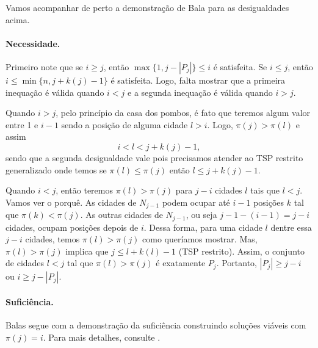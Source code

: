 \documentclass{article}
\begin{document}
Vamos acompanhar de perto a demonstração de Bala para as desigualdades acima.

\paragraph{Necessidade.} Primeiro note que se $i \geq j$, então $\max \{1, j - |P_j|\} \leq i$ é satisfeita. Se $i \leq j$, então $i \leq \min\{n, j + k(j) - 1\}$ é satisfeita. Logo, falta mostrar que a primeira inequação é válida quando $i < j$ e a segunda inequação é válida quando $i > j$.

Quando $i > j$, pelo princípio da casa dos pombos, é fato que teremos algum valor entre 1 e $i-1$ sendo a posição de alguma cidade $l > i$. Logo, $\pi(j) > \pi(l)$ e assim
$$ i < l < j + k(j) - 1,$$ sendo que a segunda desigualdade vale pois precisamos atender ao TSP restrito generalizado onde temos se $\pi(l) \leq \pi(j)$ então $l \leq j + k(j) - 1$.

Quando $i < j$, então teremos $\pi(l) > \pi(j)$ para $j-i$ cidades $l$ tais que $l < j$. Vamos ver o porquê. As cidades de $N_{j-1}$ podem ocupar até $i-1$ posições $k$ tal que $\pi(k) < \pi(j)$. As outras cidades de $N_{j-1}$, ou seja $j-1-(i-1)=j-i$ cidades, ocupam posições depois de $i$. Dessa forma, para uma cidade $l$ dentre essa $j-i$ cidades, temos $\pi(l) > \pi(j)$ como queríamos mostrar. Mas, $\pi(l) > \pi(j)$ implica que $j \leq l + k(l) -1$ (TSP restrito). Assim, o conjunto de cidades $l < j$ tal que $\pi(l) > \pi(j)$ é exatamente $P_j$. Portanto, $|P_j| \geq j-i$ ou $i \geq j - |P_j|$.

\paragraph{Suficiência.} Balas segue com a demonstração da suficiência construindo soluções viáveis com $\pi(j)=i$. Para mais detalhes, consulte \cite{Ba}.%


\end{document}

